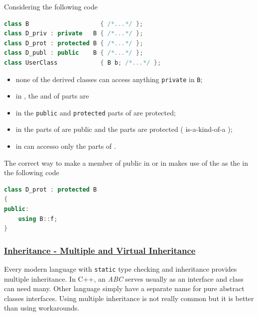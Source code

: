 Considering the following code
\begin{lstlisting}[language=C++]
class B                    { /*...*/ };
class D_priv : private   B { /*...*/ };
class D_prot : protected B { /*...*/ };
class D_publ : public    B { /*...*/ };
class UserClass            { B b; /*...*/ };
\end{lstlisting}
\begin{itemize}
    \item none of the derived classes can access anything \texttt{private} in \texttt{B};
    
    \item in , the  and 
     of  parts are 
    
    \item in  the \texttt{public} and 
    \texttt{protected} parts of  are protected;
    
    \item in  the  parts 
    of  are public and the  parts 
    are protected ( is-a-kind-of-a );
    
    \item in  can accesso only the 
     parts of .
\end{itemize}
The correct way to make a  member 
 of  
public in  or in  
makes use of the  as the in the following 
code
\begin{lstlisting}[language=C++]
class D_prot : protected B
{
public:
    using B::f;
}
\end{lstlisting}


\subsubsection{\href{https://isocpp.org/wiki/faq/multiple-inheritance}{\textbf{Inheritance - Multiple and Virtual Inheritance}}}
Every modern language with \texttt{static} type checking and inheritance 
provides multiple inheritance. In C++, an \textit{ABC} serves usually as 
an interface and class can need many. Other language simply have a 
separate name for pure abstract classes interfaces. Using multiple 
inheritance is not really common but it is better than using 
workarounds.

